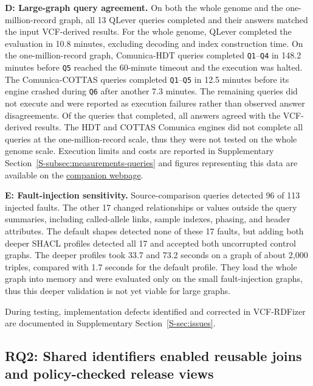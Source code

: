 \documentclass[pdflatex,sn-mathphys-num]{sn-jnl}
\begin{document}
\textbf{D: Large-graph query agreement.}
On both the whole genome and the one-million-record graph, all 13 QLever queries completed and their answers matched the input VCF-derived results.
For the whole genome, QLever completed the evaluation in 10.8 minutes, excluding decoding and index construction time. 
On the one-million-record graph, Comunica-HDT queries completed \texttt{Q1}–\texttt{Q4} in 148.2 minutes before \texttt{Q5} reached the 60-minute timeout and the execution was halted.
The Comunica-COTTAS queries completed \texttt{Q1}–\texttt{Q5} in 12.5 minutes before its engine crashed during \texttt{Q6} after another 7.3 minutes. 
The remaining queries did not execute and were reported as execution failures rather than observed answer disagreements.
Of the queries that completed, all answers agreed with the VCF-derived results.
The HDT and COTTAS Comunica engines did not complete all queries at the one-million-record scale, thus they were not tested on the whole genome scale.
Execution limits and costs are reported in Supplementary Section~\ref{S-subsec:measurements-queries} and figures representing this data are available on the \href{https://ecrum19.github.io/vcf-rdfizer-testing/#rq1}{companion webpage}.

\textbf{E: Fault-injection sensitivity.}
Source-comparison queries detected 96 of 113 injected faults.
The other 17 changed relationships or values outside the query summaries, including called-allele links, sample indexes, phasing, and header attributes.
The default shapes detected none of these 17 faults, but adding both deeper SHACL profiles detected all 17 and accepted both uncorrupted control graphs.
The deeper profiles took 33.7 and 73.2 seconds on a graph of about 2,000 triples, compared with 1.7 seconds for the default profile.
They load the whole graph into memory and were evaluated only on the small fault-injection graphs, thus this deeper validation is not yet viable for large graphs.

During testing, implementation defects identified and corrected in VCF-RDFizer are documented in Supplementary Section~\ref{S-sec:issues}.

\subsection{RQ2: Shared identifiers enabled reusable joins and policy-checked release views}\label{subsec:results-workflow}
\end{document}
